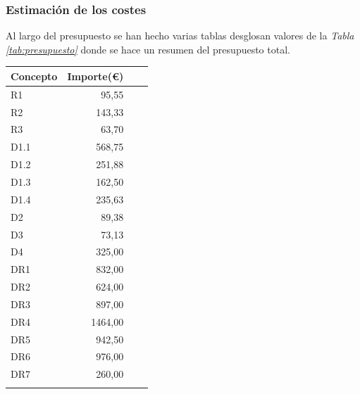 \documentclass[12pt]{article}
\begin{document}
    \subsubsection{Estimación de los costes}\label{sec:presupuesto}
    Al largo del presupuesto se han hecho varias tablas desglosan valores de la \textit{Tabla \ref{tab:presupuesto}} donde se hace un resumen del presupuesto total.
        \begin{table}[H]
        \begin{center}
            \begin{tabular}{ |l|r|c|r| } \hline
                Concepto                    & Importe(\euro)  \\ \hline
                  R1                         & 95,55           \\ \hline
                  R2                         & 143,33          \\ \hline
                  R3                         & 63,70           \\ \hline
                  D1.1                       & 568,75          \\ \hline
                  D1.2                       & 251,88          \\ \hline
                  D1.3                       & 162,50          \\ \hline
                  D1.4                       & 235,63          \\ \hline
                  D2                         & 89,38           \\ \hline
                  D3                         & 73,13           \\ \hline
                  D4                         & 325,00          \\ \hline
                  DR1                        & 832,00          \\ \hline
                  DR2                        & 624,00          \\ \hline
                  DR3                        & 897,00          \\ \hline
                  DR4                        & 1464,00         \\ \hline
                  DR5                        & 942,50          \\ \hline
                  DR6                        & 976,00          \\ \hline
                  DR7                        & 260,00          \\ \hline\rowcolor[gray]{.9}

\end{tabular}
\end{center}
\end{table}
\end{document}
